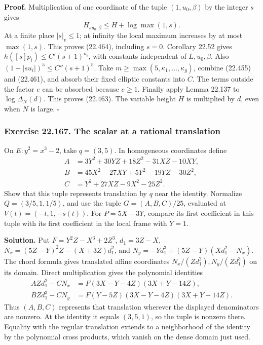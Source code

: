 \documentclass[
  11pt,
  a4paper,
]{article}
\begin{document}
\textbf{Proof.} Multiplication of one coordinate of the tuple
\((1,u_0,\beta)\) by the integer \(s\) gives \[
 H_{su_0,\beta}\le H+\log\max(1,s).
 \tag{22.464}
\] At a finite place \(|s|_v\le1\); at infinity the local maximum
increases by at most \(\max(1,s)\). This proves (22.464), including
\(s=0\). Corollary 22.52 gives \(h([s]p_i)\le C'(s+1)^{\kappa_i}\), with
constants independent of \(L,u_0,\beta\). Also
\((1+|su_i|)^5\le C''(s+1)^5\). Take
\(m\ge\max(5,\kappa_1,\ldots,\kappa_g)\), combine (22.455) and (22.461),
and absorb their fixed elliptic constants into \(C\). The terms outside
the factor \(e\) can be absorbed because \(e\ge1\). Finally apply Lemma
22.137 to \(\log\Delta_N(d)\). This proves (22.463). The variable height
\(H\) is multiplied by \(d\), even when \(N\) is large. \(\square\)

\subsubsection{Exercise 22.167. The scalar at a rational
translation}\label{exercise-22.167.-the-scalar-at-a-rational-translation}

On \(E:y^2=x^3-2\), take \(q=(3,5)\). In homogeneous coordinates define
\[
\begin{split}
 A&=3Y^2+30YZ+18Z^2-31XZ-10XY,\\
 B&=45X^2-27XY+5Y^2-19YZ-30Z^2,\\
 C&=Y^2+27XZ-9X^2-25Z^2.
\end{split}
\tag{22.465}
\] Show that this tuple represents translation by \(q\) near the
identity. Normalize \(Q=(3/5,1,1/5)\), and use the tuple
\(G=(A,B,C)/25\), evaluated at \(V(t)=(-t,1,-s(t))\). For \(P=5X-3Y\),
compare its first coefficient in this tuple with its first coefficient
in the local frame with \(Y=1\).

\textbf{Solution.} Put \(F=Y^2Z-X^3+2Z^3\), \(d_1=3Z-X\),
\(N_x=(5Z-Y)^2Z-(X+3Z)d_1^2\), and \(N_y=-Yd_1^3+(5Z-Y)(Xd_1^2-N_x)\).
The chord formula gives translated affine coordinates
\(N_x/(Zd_1^2),N_y/(Zd_1^3)\) on its domain. Direct multiplication gives
the polynomial identities \[
\begin{split}
 AZd_1^2-CN_x&=F(3X-Y-4Z)(3X+Y-14Z),\\
 BZd_1^3-CN_y&=F(Y-5Z)(3X-Y-4Z)(3X+Y-14Z).
\end{split}
\tag{22.466}
\] Thus \((A,B,C)\) represents that translation wherever the displayed
denominators are nonzero. At the identity it equals \((3,5,1)\), so the
tuple is nonzero there. Equality with the regular translation extends to
a neighborhood of the identity by the polynomial cross products, which
vanish on the dense domain just used.
\end{document}
